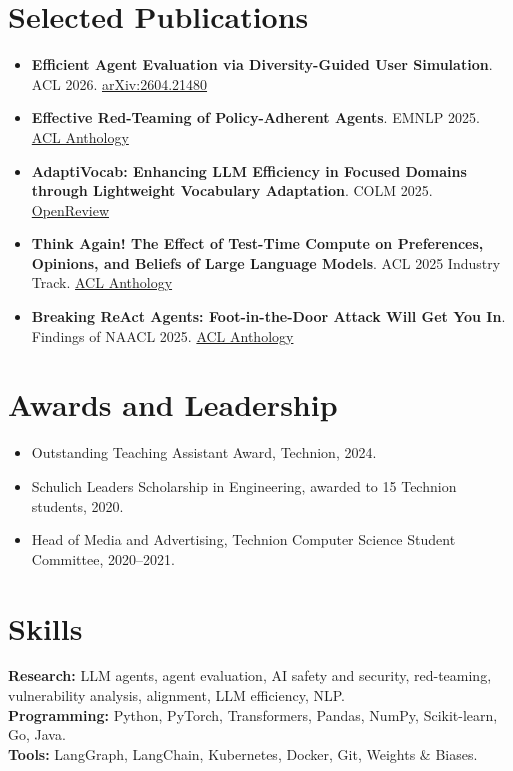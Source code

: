\documentclass[10pt]{article}
\begin{document}
\section*{Selected Publications}
\begin{itemize}
  \item \textbf{Efficient Agent Evaluation via Diversity-Guided User Simulation}. ACL 2026. \href{https://arxiv.org/abs/2604.21480}{arXiv:2604.21480}
  \item \textbf{Effective Red-Teaming of Policy-Adherent Agents}. EMNLP 2025. \href{https://aclanthology.org/2025.emnlp-main.114/}{ACL Anthology}
  \item \textbf{AdaptiVocab: Enhancing LLM Efficiency in Focused Domains through Lightweight Vocabulary Adaptation}. COLM 2025. \href{https://openreview.net/forum?id=TyXf9dwpZP}{OpenReview}
  \item \textbf{Think Again! The Effect of Test-Time Compute on Preferences, Opinions, and Beliefs of Large Language Models}. ACL 2025 Industry Track. \href{https://aclanthology.org/2025.acl-industry.45/}{ACL Anthology}
  \item \textbf{Breaking ReAct Agents: Foot-in-the-Door Attack Will Get You In}. Findings of NAACL 2025. \href{https://aclanthology.org/2025.findings-naacl.363/}{ACL Anthology}
\end{itemize}

\section*{Awards and Leadership}
\begin{itemize}
  \item Outstanding Teaching Assistant Award, Technion, 2024.
  \item Schulich Leaders Scholarship in Engineering, awarded to 15 Technion students, 2020.
  \item Head of Media and Advertising, Technion Computer Science Student Committee, 2020--2021.
\end{itemize}

\section*{Skills}
\textbf{Research:} LLM agents, agent evaluation, AI safety and security, red-teaming, vulnerability analysis, alignment, LLM efficiency, NLP.\\
\textbf{Programming:} Python, PyTorch, Transformers, Pandas, NumPy, Scikit-learn, Go, Java.\\
\textbf{Tools:} LangGraph, LangChain, Kubernetes, Docker, Git, Weights \& Biases.
\end{document}
